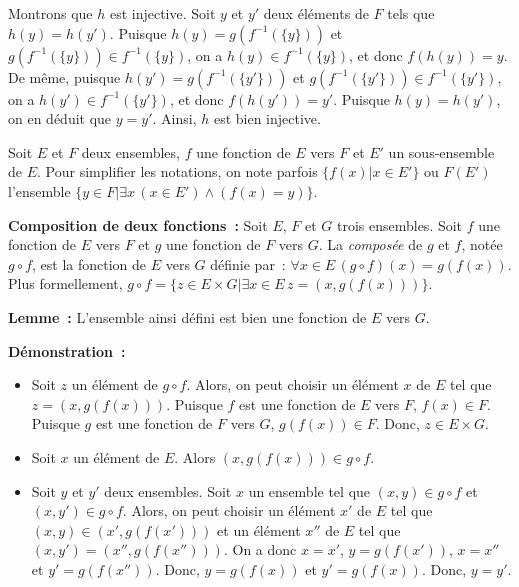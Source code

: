     Montrons que $h$ est injective. 
    Soit $y$ et $y'$ deux éléments de $F$ tels que $h(y) = h(y')$. 
    Puisque $h(y) = g (f^{-1}(\lbrace y \rbrace))$ et $g (f^{-1}(\lbrace y \rbrace)) \in f^{-1}(\lbrace y \rbrace)$, on a $h(y) \in f^{-1}(\lbrace y \rbrace)$, et donc $f(h(y)) = y$.
    De même, puisque $h(y') = g (f^{-1}(\lbrace y' \rbrace))$ et $g (f^{-1}(\lbrace y' \rbrace)) \in f^{-1}(\lbrace y' \rbrace)$, on a $h(y') \in f^{-1}(\lbrace y' \rbrace)$, et donc $f(h(y')) = y'$.
    Puisque $h(y) = h(y')$, on en déduit que $y = y'$. 
    Ainsi, $h$ est bien injective. 

   \done 

\medskip

Soit $E$ et $F$ deux ensembles, $f$ une fonction de $E$ vers $F$ et $E'$ un sous-ensemble de $E$. 
Pour simplifier les notations, on note parfois $\lbrace f(x) \vert x \in E' \rbrace$ ou $F(E')$ l'ensemble $\lbrace y \in F \vert \exists x \, (x \in E') \wedge (f(x) = y) \rbrace$. 

\medskip

\noindent\textbf{Composition de deux fonctions :} Soit $E$, $F$ et $G$ trois ensembles. 
    Soit $f$ une fonction de $E$ vers $F$ et $g$ une fonction de $F$ vers $G$. 
    La \textit{composée} de $g$ et $f$, notée $g \circ f$, est la fonction de $E$ vers $G$ définie par : $\forall x \in E \, (g \circ f) (x) = g(f(x))$. 
    Plus formellement, $g \circ f = \lbrace z \in E \times G \vert \exists x \in E \, z = (x,g(f(x))) \rbrace$.

\medskip

\noindent\textbf{Lemme :} L'ensemble ainsi défini est bien une fonction de $E$ vers $G$.

\medskip

\noindent\textbf{Démonstration :} 
\begin{itemize}[nosep]
    \item Soit $z$ un élément de $g \circ f$. 
        Alors, on peut choisir un élément $x$ de $E$ tel que $z = (x,g(f(x)))$. 
        Puisque $f$ est une fonction de $E$ vers $F$, $f(x) \in F$.
        Puisque $g$ est une fonction de $F$ vers $G$, $g(f(x)) \in F$.
        Donc, $z \in E \times G$.
    \item Soit $x$ un élément de $E$. Alors $(x,g(f(x))) \in g \circ f$.
    \item Soit $y$ et $y'$ deux ensembles. 
        Soit $x$ un ensemble tel que $(x,y) \in g \circ f$ et $(x,y') \in g \circ f$. 
        Alors, on peut choisir un élément $x'$ de $E$ tel que $(x,y) \in (x',g(f(x')))$ et un élément $x''$ de $E$ tel que $(x,y') = (x'',g(f(x'')))$. 
        On a donc $x = x'$, $y = g(f(x'))$, $x = x''$ et $y' = g(f(x''))$. 
        Donc, $y = g(f(x))$ et $y' = g(f(x))$. 
        Donc, $y = y'$.
\end{itemize}

